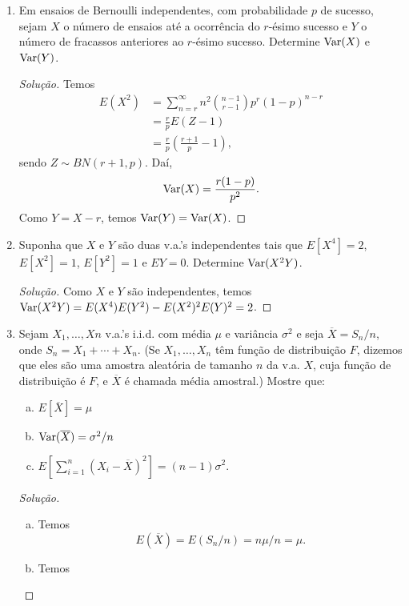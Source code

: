 \documentclass[../Notas.tex]{subfiles}
\begin{document}
\begin{enumerate}
    \item Em ensaios de Bernoulli independentes, com probabilidade $p$ de sucesso, sejam $X$ o número de ensaios até a ocorrência do $r$-ésimo sucesso e $Y$ o número de fracassos anteriores ao $r$-ésimo sucesso. Determine $\text{Var}(X)$ e $\text{Var}(Y)$.
    \begin{proof}[Solução]
        Temos
        \begin{align*}
            E(X^2) &= \sum_{n=r}^{\infty} n^2\binom{n-1}{r-1}p^r(1-p)^{n-r} \\
                   &= \frac{r}{p}E(Z-1) \\
                   &= \frac{r}{p}\left( \frac{r+1}{p} - 1 \right),
        \end{align*}
        sendo $Z\sim BN(r+1,p)$. Daí,
        \[
        \text{Var}(X) = \frac{r(1-p)}{p^2}.
        \]
        Como $Y = X-r$, temos $\text{Var}(Y) = \text{Var}(X)$.
    \end{proof}
    \item Suponha que $X$ e $Y$ são duas v.a.’s independentes tais que $E[X^4] = 2$, $E[X^2] = 1$, $E[Y^2] = 1$ e $EY = 0.$ Determine $\text{Var}(X^2Y)$.
    \begin{proof}[Solução]
        Como $X$ e $Y$ são independentes, temos $\text{Var}(X^2Y) = E(X^4)E(Y^2) - E(X^2)^2E(Y)^2 = 2$.
    \end{proof}
    \item Sejam $X_1 ,\dots, X n$ v.a.’s i.i.d. com média $\mu$ e variância $\sigma^2$ e seja $\overline{X} = S_n/n$, onde $S_n = X_1 + \cdots + X_n$. (Se $X_1,\dots, X_n$ têm função de distribuição $F$, dizemos que eles são uma amostra aleatória de tamanho $n$ da v.a. $X$, cuja função de distribuição é $F$, e $\overline{X}$ é chamada média amostral.) Mostre que:
    \begin{enumerate}[a)]
    \item $E[\overline{X}] = \mu$
    \item $\text{Var}(\overline{X}) = \sigma^2/n$
    \item $E \left[ \sum_{i=1}^n (X_i - \overline{X})^2 \right] = (n - 1)\sigma^2$.
    \end{enumerate}
    \begin{proof}[Solução]
        \begin{enumerate}[a)]
            \item Temos
            \[
            E(\overline{X}) = E(S_n/n) = n\mu/n = \mu.
            \]
            \item Temos

\end{enumerate}
\end{proof}
\end{enumerate}
\end{document}
